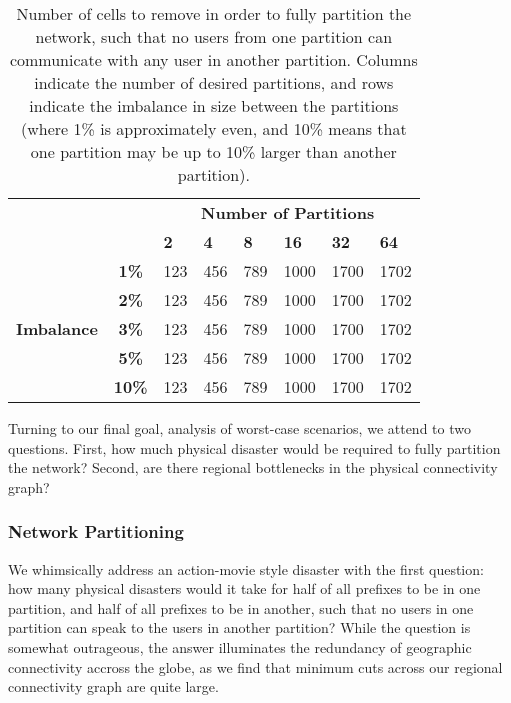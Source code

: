     \begin{table}
        \centering
        \begin{tabular}{lc|l|l|l|l|l|l}
            &&\multicolumn{6}{c}{\bf Number of Partitions}\\
            &&{\bf 2}&{\bf 4}&{\bf 8}&{\bf 16}&{\bf 32}&{\bf 64}\\
            \hline
            \multirow{5}{*}{\begin{sideways}{\bf Imbalance}\end{sideways}}
            &{\bf 1\%}&123&456&789&1000&1700&1702\\
            &{\bf 2\%}&123&456&789&1000&1700&1702\\
            &{\bf 3\%}&123&456&789&1000&1700&1702\\
            &{\bf 5\%}&123&456&789&1000&1700&1702\\
            &{\bf 10\%}&123&456&789&1000&1700&1702\\
        \end{tabular}
        \caption[]{\label{tbl:hmetis} Number of cells to remove in order to fully partition the network, such that no users from one partition can communicate with any user in another partition. Columns indicate the number of desired partitions, and rows indicate the imbalance in size between the partitions (where 1\% is approximately even, and 10\% means that one partition may be up to 10\% larger than another partition). }
    \end{table}
        
    Turning to our final goal, analysis of worst-case scenarios, we attend to two questions. 
    First, how much physical disaster would be required to fully partition the network?         
    Second, are there regional bottlenecks in the physical connectivity graph?

    \subsubsection*{Network Partitioning}
    We whimsically address an action-movie style disaster with the first question: how many physical disasters would it take for half of all prefixes to be in one partition, and half of all prefixes to be in another, such that no users in one partition can speak to the users in another partition?
    While the question is somewhat outrageous, the answer illuminates the redundancy of geographic connectivity accross the globe, as we find that minimum cuts across our regional connectivity graph are quite large.
    
